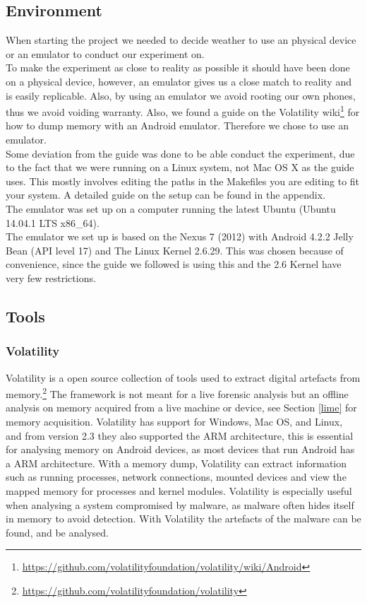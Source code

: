 \subsection{Environment}
When starting the project we needed to decide weather to use an physical device or an emulator
to conduct our experiment on.\\
To make the experiment as close to reality as possible it should have been done on a physical device, 
however, an emulator gives us a close match to reality and is easily replicable. Also, by using an emulator 
we avoid rooting our own phones, thus we avoid voiding warranty. Also, we found a guide on the Volatility 
wiki\footnote{\url{https://github.com/volatilityfoundation/volatility/wiki/Android}} for how to dump memory with 
an Android emulator. Therefore we chose to use an emulator.\\
Some deviation from the guide was done to be able conduct the experiment, due to the fact that we were running on 
a Linux system, not Mac OS X as the guide uses. This mostly involves editing the paths in the Makefiles you are editing 
to fit your system. %
A detailed guide on the setup can be found in the appendix.\\

The emulator was set up on a computer running the latest Ubuntu (Ubuntu 14.04.1 LTS x86\_64).\\
The emulator we set up is based on the Nexus 7 (2012) with Android 4.2.2 Jelly Bean (API level 17) and The Linux Kernel 2.6.29. 
This was chosen because of convenience, since the guide we followed is using this and the 2.6 Kernel have very few restrictions.
\subsection{Tools}
  \subsubsection{Volatility}
  Volatility is a open source collection of tools used to extract digital
  artefacts from memory.\footnote{\url{https://github.com/volatilityfoundation/volatility}} 
  The framework is not meant for a live forensic analysis but an offline analysis
  on memory acquired from a live machine or device, see Section \ref{lime} for
  memory acquisition. Volatility has support for Windows, Mac OS, and Linux, and
  from version 2.3 they also supported the ARM architecture, this is essential
  for analysing memory on Android devices, as most devices that run Android has a
  ARM architecture. With a memory dump, Volatility can extract information such as
  running processes, network connections, mounted devices and view the mapped
  memory for processes and kernel modules. Volatility is especially useful when
  analysing a system compromised by malware, as malware often hides itself in
  memory to avoid detection. With Volatility the artefacts of the malware can be
  found, and be analysed. \\
  
